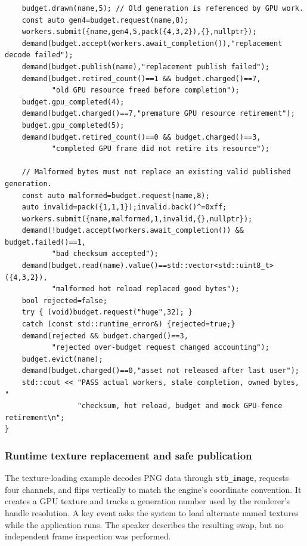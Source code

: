 \begin{verbatim}
    budget.drawn(name,5); // Old generation is referenced by GPU work.
    const auto gen4=budget.request(name,8);
    workers.submit({name,gen4,5,pack({4,3,2}),{},nullptr});
    demand(budget.accept(workers.await_completion()),"replacement decode failed");
    demand(budget.publish(name),"replacement publish failed");
    demand(budget.retired_count()==1 && budget.charged()==7,
           "old GPU resource freed before completion");
    budget.gpu_completed(4);
    demand(budget.charged()==7,"premature GPU resource retirement");
    budget.gpu_completed(5);
    demand(budget.retired_count()==0 && budget.charged()==3,
           "completed GPU frame did not retire its resource");

    // Malformed bytes must not replace an existing valid published generation.
    const auto malformed=budget.request(name,8);
    auto invalid=pack({1,1,1});invalid.back()^=0xff;
    workers.submit({name,malformed,1,invalid,{},nullptr});
    demand(!budget.accept(workers.await_completion()) && budget.failed()==1,
           "bad checksum accepted");
    demand(budget.read(name).value()==std::vector<std::uint8_t>({4,3,2}),
           "malformed hot reload replaced good bytes");
    bool rejected=false;
    try { (void)budget.request("huge",32); }
    catch (const std::runtime_error&) {rejected=true;}
    demand(rejected && budget.charged()==3,
           "rejected over-budget request changed accounting");
    budget.evict(name);
    demand(budget.charged()==0,"asset not released after last user");
    std::cout << "PASS actual workers, stale completion, owned bytes, "
                 "checksum, hot reload, budget and mock GPU-fence retirement\n";
}
\end{verbatim}

\subsubsection{Runtime texture replacement and safe publication}\label{06-engine-ii-ch027-runtime-texture-replacement-and-safe-publication}

\hypertarget{06-engine-ii-ch027-runtime-texture-replacement-and-safe-publication}{}

The texture-loading example decodes PNG data through \texttt{stb\_image}, requests four channels, and flips vertically to match the engine's coordinate convention. It creates a GPU texture and tracks a generation number used by the renderer's handle resolution. A key event asks the system to load alternate named textures while the application runs. The speaker describes the resulting swap, but no independent frame inspection was performed.

